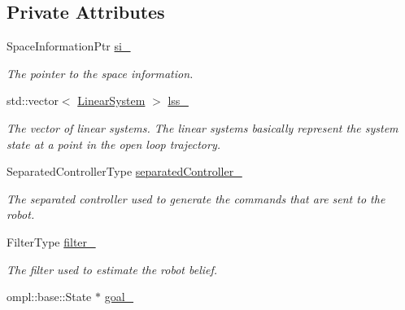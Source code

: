 \subsection*{\-Private \-Attributes}
\begin{DoxyCompactItemize}
\item 
\hypertarget{class_controller_a34912a3b87662649231e2d096882c454}{\-Space\-Information\-Ptr \hyperlink{class_controller_a34912a3b87662649231e2d096882c454}{si\-\_\-}}\label{class_controller_a34912a3b87662649231e2d096882c454}

\begin{DoxyCompactList}\small\item\em \-The pointer to the space information. \end{DoxyCompactList}\item 
\hypertarget{class_controller_acb68b603afc759b4e62b8c6db8125671}{std\-::vector$<$ \hyperlink{class_linear_system}{\-Linear\-System} $>$ \hyperlink{class_controller_acb68b603afc759b4e62b8c6db8125671}{lss\-\_\-}}\label{class_controller_acb68b603afc759b4e62b8c6db8125671}

\begin{DoxyCompactList}\small\item\em \-The vector of linear systems. \-The linear systems basically represent the system state at a point in the open loop trajectory. \end{DoxyCompactList}\item 
\hypertarget{class_controller_a040da727bdc40ab69f0c3e4033bc9df9}{\-Separated\-Controller\-Type \hyperlink{class_controller_a040da727bdc40ab69f0c3e4033bc9df9}{separated\-Controller\-\_\-}}\label{class_controller_a040da727bdc40ab69f0c3e4033bc9df9}

\begin{DoxyCompactList}\small\item\em \-The separated controller used to generate the commands that are sent to the robot. \end{DoxyCompactList}\item 
\hypertarget{class_controller_a9ff37d34a8a9a20f606c501d2ab5cb2e}{\-Filter\-Type \hyperlink{class_controller_a9ff37d34a8a9a20f606c501d2ab5cb2e}{filter\-\_\-}}\label{class_controller_a9ff37d34a8a9a20f606c501d2ab5cb2e}

\begin{DoxyCompactList}\small\item\em \-The filter used to estimate the robot belief. \end{DoxyCompactList}\item 
\hypertarget{class_controller_a4e5e3c0828c9e0d216e7d53f3625d9b4}{ompl\-::base\-::\-State $\ast$ \hyperlink{class_controller_a4e5e3c0828c9e0d216e7d53f3625d9b4}{goal\-\_\-}}\label{class_controller_a4e5e3c0828c9e0d216e7d53f3625d9b4}


\end{DoxyCompactItemize}
